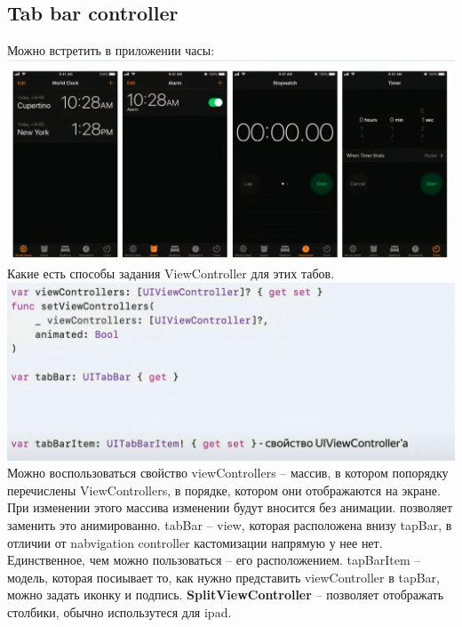 \documentclass{article}
\begin{document}
    \subsection{Tab bar controller}
    Можно встретить в приложении часы: 
    \newline
    \includegraphics[scale = 0.5]{pic/Снимок экрана 2023-08-03 в 11.08.04.png}
    \newline
    Какие есть способы задания ViewController для этих табов. 
    \newline
    \includegraphics[scale = 0.5]{pic/Снимок экрана 2023-08-03 в 11.08.51.png}
    \newline
    Можно воспользоваться свойство viewControllers -- массив, в котором попорядку перечислены ViewControllers, в порядке, котором они отображаются на экране. 
    \newline
    При изменении этого массива изменении будут вносится без анимации.  позволяет заменить это анимированно. 
    \newline
    tabBar -- view, которая расположена внизу tapBar, в отличии от nabvigation controller кастомизации напрямую у нее нет. Единственное, чем можно пользоваться -- его расположением. tapBarItem -- модель, которая посиывает то, как нужно представить viewController в tapBar, можно задать иконку и подпись. 
    \newline
    \textbf{SplitViewController} -- позволяет отображать столбики, обычно использутеся для ipad.
\end{document}
